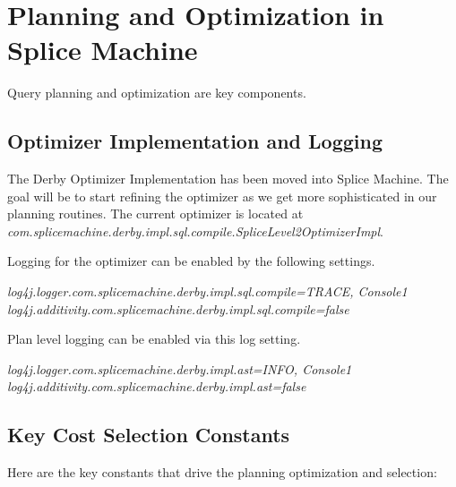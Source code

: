 \section{Planning and Optimization in Splice Machine}
Query planning and optimization are key components.

\subsection{Optimizer Implementation and Logging}

The Derby Optimizer Implementation has been moved into Splice Machine.  The goal
will be to start refining the optimizer as we get more sophisticated in our
planning routines.  The current optimizer is located at 
\emph{com.splicemachine.derby.impl.sql.compile.SpliceLevel2OptimizerImpl}.

Logging for the optimizer can be enabled by the following settings.

\emph{log4j.logger.com.splicemachine.derby.impl.sql.compile=TRACE, Console1}
\emph{log4j.additivity.com.splicemachine.derby.impl.sql.compile=false}

Plan level logging can be enabled via this log setting.

\emph{log4j.logger.com.splicemachine.derby.impl.ast=INFO, Console1}
\emph{log4j.additivity.com.splicemachine.derby.impl.ast=false}

\subsection{Key Cost Selection Constants}

Here are the key constants that drive the planning optimization and selection:

